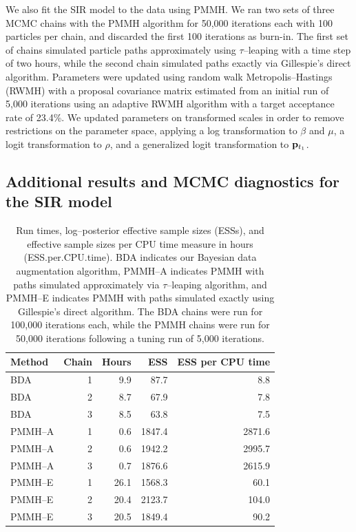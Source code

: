 We also fit the SIR model to the data using PMMH. We ran two sets of three MCMC chains with the PMMH algorithm for 50,000 iterations each with 100 particles per chain, and discarded the first 100 iterations as burn-in. The first set of chains simulated particle paths approximately using $ \tau $--leaping with a time step of two hours, while the second chain simulated paths exactly via Gillespie's direct algorithm. Parameters were updated using random walk Metropolis--Hastings (RWMH) with a proposal covariance matrix estimated from an initial run of 5,000 iterations using an adaptive RWMH algorithm with a target acceptance rate of 23.4\%. We updated parameters on transformed scales in  order to remove restrictions on the parameter space, applying a log transformation to $ \beta $ and $ \mu $, a logit transformation to $ \rho $, and a generalized logit transformation to $ \mathbf{p}_{t_1} $.

\newpage
\subsection{Additional results and MCMC diagnostics for the SIR model}
\begin{table}[htbp]
	\centering
	\begin{tabular}{lrrrr}
		\hline
		Method & Chain & Hours & ESS & ESS per CPU time \\ 
		\hline
		BDA &  1 & 9.9 & 87.7 & 8.8 \\ 
		BDA &  2 & 8.7 & 67.9 & 7.8 \\ 
		BDA &  3 & 8.5 & 63.8 & 7.5 \\ 
		PMMH--A &  1 & 0.6 & 1847.4 & 2871.6 \\ 
		PMMH--A &  2 & 0.6 & 1942.2 & 2995.7 \\ 
		PMMH--A &  3 & 0.7 & 1876.6 & 2615.9 \\ 
		PMMH--E &  1 & 26.1 & 1568.3 & 60.1 \\ 
		PMMH--E &  2 & 20.4 & 2123.7 & 104.0 \\ 
		PMMH--E &  3 & 20.5 & 1849.4 & 90.2 \\ 
		\hline
	\end{tabular}
	\caption[Simulation 1 log--posterior effective sample sizes and run times.]{Run times, log--posterior effective sample sizes (ESSs), and effective sample sizes per CPU time measure in hours (ESS.per.CPU.time). BDA indicates our Bayesian data augmentation algorithm, PMMH--A indicates PMMH with paths simulated approximately via $ \tau $--leaping algorithm, and PMMH--E indicates PMMH with paths simulated exactly using Gillespie's direct algorithm. The BDA chains were run for 100,000 iterations each, while the PMMH chains were run for 50,000 iterations following a tuning run of 5,000 iterations.}
	\label{tab:sim1_sir_ess}
\end{table}

